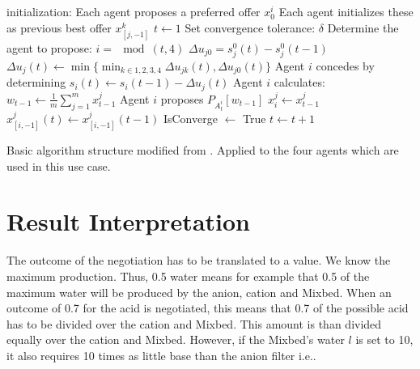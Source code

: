\begin{algorithm}[h]
	initialization: Each agent proposes a preferred offer $x^i_0$\;
	Each agent initializes these as previous best offer $x^k_{[j,-1]}$\;
	$t\leftarrow1$\;
	Set convergence tolerance: $\delta$\;
	{
		Determine the agent to propose: $i = \mod(t,4)$\;
		{
			{
				$\Delta u_{j0} = s^0_j(t)-s^0_j(t-1)$\;
				{
					$\Delta u_j(t)\leftarrow \min \{\displaystyle \min_{k\in 1, 2, 3, 4}\Delta u_{jk}(t), \Delta u_{j0}(t)\}$ \;	
				}
				Agent $i$ concedes by determining $s_i(t)\leftarrow s_i(t-1)-\Delta u_j(t)$\;
				Agent $i$ calculates: $w_{t-1}\leftarrow \frac{1}{m}\sum_{j=1}^{m}x^j_{t-1}$\;
				Agent $i$ proposes $P_{A^i_t}[w_{t-1}]$\;
			}{
				$x^j_i \leftarrow x^j_{t-1}$\;
				$x^j_{[i,-1]}(t) \leftarrow x^j_{[i,-1]}(t-1)$\;
			}
		}
		{
			IsConverge $\leftarrow $ True\;
		}{
			$t \leftarrow t+1$\;
		}
	}
\caption{Basic algorithm structure modified from \citep{zheng2015automated}. Applied to the four agents which are used in this use case.}
\label{al:algorithm1}
\end{algorithm}
\clearpage
\section{Result Interpretation}
\label{sec:design:mean}
The outcome of the negotiation has to be translated to a value. We know the maximum production. Thus, 0.5 water means for example that 0.5 of the maximum water will be produced by the anion, cation and Mixbed. When an outcome of 0.7 for the acid is negotiated, this means that 0.7 of the possible acid has to be divided over the cation and Mixbed. This amount is than divided equally over the cation and Mixbed. However, if the Mixbed's water $l$ is set to 10, it also requires 10 times as little base than the anion filter i.e..

